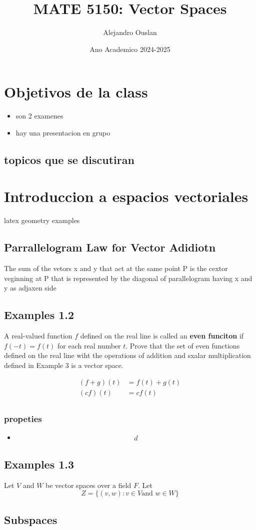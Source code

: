 \documentclass[10pt, oneside]{article}
\title{MATE 5150: Vector Spaces}
\author{Alejandro Ouslan}
\date{Ano Academico 2024-2025}
\begin{document}
\maketitle
\tableofcontents

\vspace{.25in}

\section{Objetivos de la class}
\begin{itemize}
	\item son 2 examenes
	\item hay una presentacion en grupo
\end{itemize}

\subsection{topicos que se discutiran}

\section{Introduccion a espacios vectoriales}
latex geometry examples
\subsection{Parrallelogram Law for Vector Adidiotn}
The sum of the vetors x and y that act at the same point P is the cextor veginning at
P that is represented by the diagonal of parallelogram having x and y as adjaxen side

\subsection{Examples 1.2}
A real-valued function $f$ defined on the real line is called an \textbf{even funciton} if $f(-t) = f(t)$
for each real number $t$. Prove that the set of even functions defined on the real line wiht the
operations of addition and sxalar multiplication defined in Example 3 is a vector space.

\[
	\begin{split}
		(f + g)(t) &= f(t) + g(t) \\
		(cf)(t) &= cf(t) \\
	\end{split}
\]

\subsubsection{propeties}

\begin{itemize}
	\item
	      \[
		      \begin{split}
			      d
		      \end{split}
	      \]
\end{itemize}

\subsection{Examples 1.3}

Let $V$ and $W$ be vector spaces over a field $F$. Let
\[ Z = \{ (v, w): v \in V \text{and } w \in W \} \]

\subsection{Subspaces}
\end{document}
